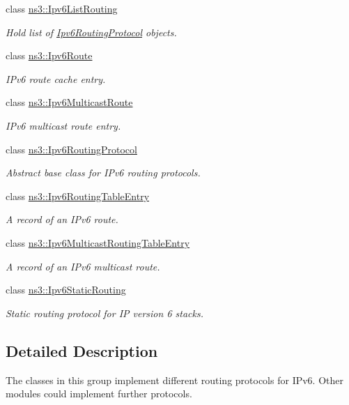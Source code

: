 \begin{DoxyCompactItemize}
\item 
class \hyperlink{classns3_1_1Ipv6ListRouting}{ns3\+::\+Ipv6\+List\+Routing}
\begin{DoxyCompactList}\small\item\em Hold list of \hyperlink{classns3_1_1Ipv6RoutingProtocol}{Ipv6\+Routing\+Protocol} objects. \end{DoxyCompactList}\item 
class \hyperlink{classns3_1_1Ipv6Route}{ns3\+::\+Ipv6\+Route}
\begin{DoxyCompactList}\small\item\em I\+Pv6 route cache entry. \end{DoxyCompactList}\item 
class \hyperlink{classns3_1_1Ipv6MulticastRoute}{ns3\+::\+Ipv6\+Multicast\+Route}
\begin{DoxyCompactList}\small\item\em I\+Pv6 multicast route entry. \end{DoxyCompactList}\item 
class \hyperlink{classns3_1_1Ipv6RoutingProtocol}{ns3\+::\+Ipv6\+Routing\+Protocol}
\begin{DoxyCompactList}\small\item\em Abstract base class for I\+Pv6 routing protocols. \end{DoxyCompactList}\item 
class \hyperlink{classns3_1_1Ipv6RoutingTableEntry}{ns3\+::\+Ipv6\+Routing\+Table\+Entry}
\begin{DoxyCompactList}\small\item\em A record of an I\+Pv6 route. \end{DoxyCompactList}\item 
class \hyperlink{classns3_1_1Ipv6MulticastRoutingTableEntry}{ns3\+::\+Ipv6\+Multicast\+Routing\+Table\+Entry}
\begin{DoxyCompactList}\small\item\em A record of an I\+Pv6 multicast route. \end{DoxyCompactList}\item 
class \hyperlink{classns3_1_1Ipv6StaticRouting}{ns3\+::\+Ipv6\+Static\+Routing}
\begin{DoxyCompactList}\small\item\em Static routing protocol for IP version 6 stacks. \end{DoxyCompactList}\end{DoxyCompactItemize}


\subsection{Detailed Description}
The classes in this group implement different routing protocols for I\+Pv6. Other modules could implement further protocols. 